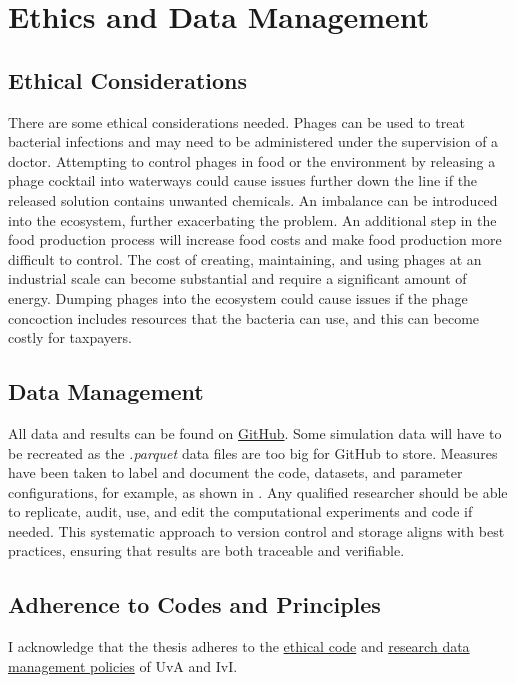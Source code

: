 \chapter{Ethics and Data Management}
\label{edm}
\section{Ethical Considerations}
There are some ethical considerations needed. 
Phages can be used to treat bacterial infections and may need to be administered under the supervision of a doctor. 
Attempting to control phages in food or the environment by releasing a phage cocktail into waterways could cause issues further down the line if the released solution contains unwanted chemicals. 
An imbalance can be introduced into the ecosystem, further exacerbating the problem. 
An additional step in the food production process will increase food costs and make food production more difficult to control. 
The cost of creating, maintaining, and using phages at an industrial scale can become substantial and require a significant amount of energy. 
Dumping phages into the ecosystem could cause issues if the phage concoction includes resources that the bacteria can use, and this can become costly for taxpayers. 

\section{Data Management}
All data and results can be found on \href{https://github.com/BiggusVickus/Master-Thesis}{GitHub}. 
Some simulation data will have to be recreated as the \textit{.parquet} data files are too big for GitHub to store. 
Measures have been taken to label and document the code, datasets, and parameter configurations, for example, as shown in . 
Any qualified researcher should be able to replicate, audit, use, and edit the computational experiments and code if needed. 
This systematic approach to version control and storage aligns with best practices, ensuring that results are both traceable and verifiable. 

\section{Adherence to Codes and Principles}
I acknowledge that the thesis adheres to the \href{https://student.uva.nl/en/topics/ethics-in-research}{ethical code} and \href{https://rdm.uva.nl/en}{research data management policies} of UvA and IvI.

